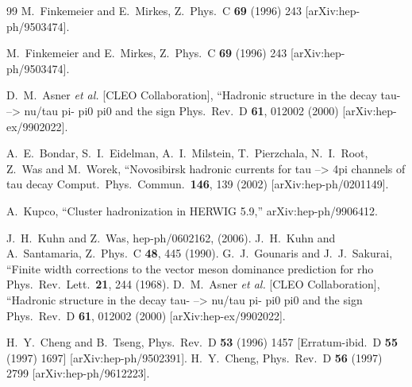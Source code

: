 \documentclass{article}
\begin{document}
\begin{thebibliography}{99}
M.~Finkemeier and E.~Mirkes,
Z.\ Phys.\  C {\bf 69} (1996) 243 [arXiv:hep-ph/9503474].

M.~Finkemeier and E.~Mirkes,
Z.\ Phys.\  C {\bf 69} (1996) 243 [arXiv:hep-ph/9503474].

  D.~M.~Asner {\it et al.}  [CLEO Collaboration],
   ``Hadronic structure in the decay tau- --> nu/tau pi- pi0 pi0 and the  sign
  Phys.\ Rev.\  D {\bf 61}, 012002 (2000)
  [arXiv:hep-ex/9902022].

  A.~E.~Bondar, S.~I.~Eidelman, A.~I.~Milstein, T.~Pierzchala, N.~I.~Root, Z.~Was and M.~Worek,
   ``Novosibirsk hadronic currents for tau --> 4pi channels of tau decay
  Comput.\ Phys.\ Commun.\  {\bf 146}, 139 (2002)
  [arXiv:hep-ph/0201149].

  A.~Kupco,
  ``Cluster hadronization in HERWIG 5.9,''
  arXiv:hep-ph/9906412.

 J.~H.~Kuhn and Z.~Was, hep-ph/0602162, (2006).
  J.~H.~Kuhn and A.~Santamaria,
  Z.\ Phys.\  C {\bf 48}, 445 (1990).
  G.~J.~Gounaris and J.~J.~Sakurai,
   ``Finite width corrections to the vector meson dominance prediction for rho
  Phys.\ Rev.\ Lett.\  {\bf 21}, 244 (1968).
  D.~M.~Asner {\it et al.}  [CLEO Collaboration],
   ``Hadronic structure in the decay tau- --> nu/tau pi- pi0 pi0 and the  sign
  Phys.\ Rev.\  D {\bf 61}, 012002 (2000)
  [arXiv:hep-ex/9902022].

  H.~Y.~Cheng and B.~Tseng,
  Phys.\ Rev.\  D {\bf 53} (1996) 1457
  [Erratum-ibid.\  D {\bf 55} (1997) 1697]
  [arXiv:hep-ph/9502391].
  H.~Y.~Cheng,
  Phys.\ Rev.\  D {\bf 56} (1997) 2799
  [arXiv:hep-ph/9612223].


\end{thebibliography}
\end{document}

